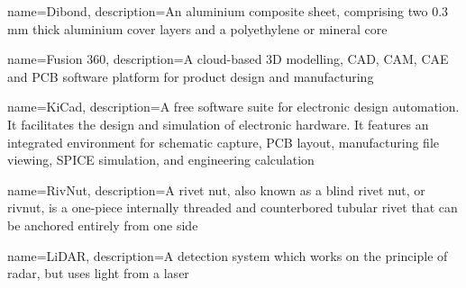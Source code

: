 {
	name=Dibond,
	description={An aluminium composite sheet, comprising two 0.3 mm thick aluminium cover layers and a polyethylene or mineral core}
}

{
	name=Fusion 360,
	description={A cloud-based 3D modelling, CAD, CAM, CAE and PCB software platform for product design and manufacturing}
}

{
	name=KiCad,
	description={A free software suite for electronic design automation. It facilitates the design and simulation of electronic hardware. It features an integrated environment for schematic capture, PCB layout, manufacturing file viewing, SPICE simulation, and engineering calculation}
}

{
	name=RivNut,
	description={A rivet nut, also known as a blind rivet nut, or rivnut, is a one-piece internally threaded and counterbored tubular rivet that can be anchored entirely from one side}
}

{
	name=LiDAR,
	description={A detection system which works on the principle of radar, but uses light from a laser}
}